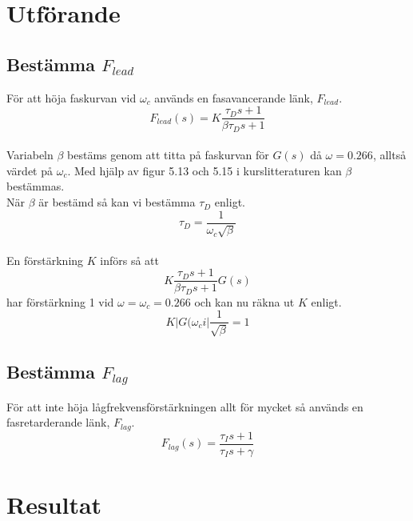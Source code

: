 \documentclass[a4paper]{article}
\begin{document}
\section{Utförande}



\subsection{Bestämma $F_{lead}$}

För att höja faskurvan vid $\omega_{c}$ används en fasavancerande länk, $F_{lead}$.
\\
\begin{equation}
  F_{lead}(s)=K\frac{\tau_{D}s+1}{\beta\tau_{D}s+1}
\end{equation}
\\
Variabeln $\beta$ bestäms genom att titta på faskurvan för $G(s)$ då $\omega = 0.266$, alltså värdet på $\omega_c$. 
Med hjälp av figur 5.13 och 5.15 i kurslitteraturen \cite{kb} kan $\beta$ bestämmas.
\\
När $\beta$ är bestämd så kan vi bestämma $\tau_D$ enligt.
\\
\begin{equation}
  \tau_D=\frac{1}{\omega_c\sqrt{\beta}}
\end{equation}
\\
En förstärkning $K$ införs så att 
\\
\begin{equation}
  K\frac{\tau_Ds+1}{\beta\tau_Ds+1}G(s)
\end{equation}
har förstärkning 1 vid $\omega = \omega_c = 0.266$ och kan nu räkna ut $K$ enligt.
\\
\begin{equation}
  K|G(\omega_ci|\frac{1}{\sqrt{\beta}}=1
\end{equation}

\subsection{Bestämma $F_{lag}$}

För att inte höja lågfrekvensförstärkningen allt för mycket så används en fasretarderande länk, $F_{lag}$.
\\
\begin{equation}
  F_{lag}(s)=\frac{\tau_Is+1}{\tau_Is+\gamma}
\end{equation}

\section{Resultat}
\end{document}

